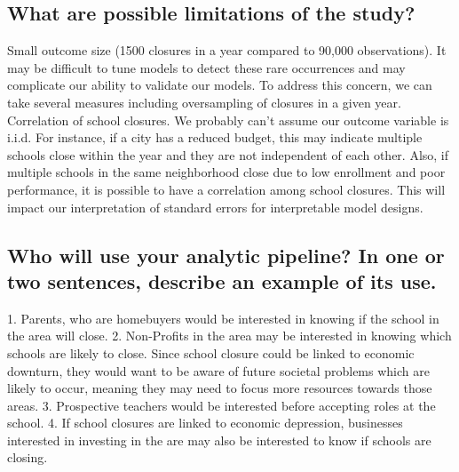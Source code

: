 \documentclass[twoside,11pt]{article}
\begin{document}
\subsection{What are possible limitations of the study?}
\begin{itemize}
Small outcome size (1500 closures in a year compared to 90,000 observations). It may be difficult to tune models to detect these rare occurrences and may complicate our ability to validate our models. To address this concern, we can take several measures including oversampling of closures in a given year. 
Correlation of school closures.  We probably can’t assume our outcome variable is i.i.d.  For instance, if a city has a reduced budget, this may indicate multiple schools close within the year and they are not independent of each other. Also, if multiple schools in the same neighborhood close due to low enrollment and poor performance, it is possible to have a correlation among school closures. This will impact our interpretation of standard errors for interpretable model designs. 
\end{itemize}
\subsection{Who will use your analytic pipeline? In one or two sentences, describe an example of its use.}

1.	Parents, who are homebuyers would be interested in knowing if the school in the area will close.
2.	Non-Profits in the area may be interested in knowing which schools are likely to close.  Since school closure could be linked to economic downturn, they would want to be aware of future societal problems which are likely to occur, meaning they may need to focus more resources towards those areas.
3.	Prospective teachers would be interested before accepting roles at the school.
4.	If school closures are linked to economic depression, businesses interested in investing in the are may also be interested to know if schools are closing.


\end{document}
